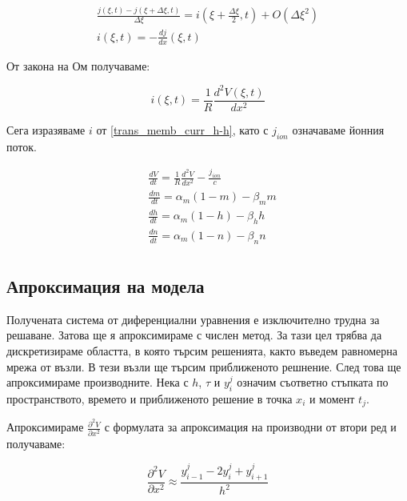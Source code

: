 \documentclass{article}
\numberwithin{equation}{section}
\begin{document}
    \begin{gather*} 
        \frac{j\left(\xi,t\right) - j\left(\xi + \Delta\xi, t\right)}{\Delta\xi} = i\left(\xi + \frac{\Delta\xi}{2},t\right) +
        O\left(\Delta\xi^2\right)\\
        i\left(\xi,t\right) = -\frac{dj}{dx}\left(\xi,t\right)
     \end{gather*}

     От закона на Ом получаваме:

     \begin{equation}
         i(\xi,t) = \frac{1}{R}\frac{d^2V(\xi,t)}{dx^2}
     \end{equation}

     Сега изразяваме $i$ от \eqref{trans_memb_curr_h-h}, като с $j_{ion}$ означаваме йонния поток.

     \begin{equation}
        \begin{aligned}
            &\frac{dV}{dt} = \frac{1}{R}\frac{d^2V}{dx^2} - \frac{j_{ion}}{c}\\
            &\frac{dm}{dt} = \alpha_m(1-m) - \beta_mm\\
            &\frac{dh}{dt} = \alpha_m(1-h) - \beta_hh\\
            &\frac{dn}{dt} = \alpha_m(1-n) - \beta_nn\\
        \end{aligned}
     \end{equation}

     \subsection{Апроксимация на модела}\label{sec:approx} 
    Получената система от диференциални уравнения е изключително трудна за решаване. Затова ще я апроксимираме с числен метод. За тази цел
    трябва да дискретизираме областта, в която търсим решенията, както въведем равномерна мрежа от възли. В тези възли ще търсим
    приближеното решнение. След това ще апроксимираме производните. Нека с $h$, $\tau$ и $y_i^j$ означим съответно стъпката по
    пространството, времето и приближеното решение в точка $x_i$ и момент $t_j$. 
    
    Апроксимираме $\frac{\partial^2 V}{\partial x^2}$ с формулата за апроксимация на производни от втори ред и получаваме:

    \begin{equation}\label{der:mid_space}
        \frac{\partial^2 V}{\partial x^2} \approx \frac{y_{i-1}^j - 2y_i^j + y_{i+1}^j}{h^2}
    \end{equation}
    
\end{document}
